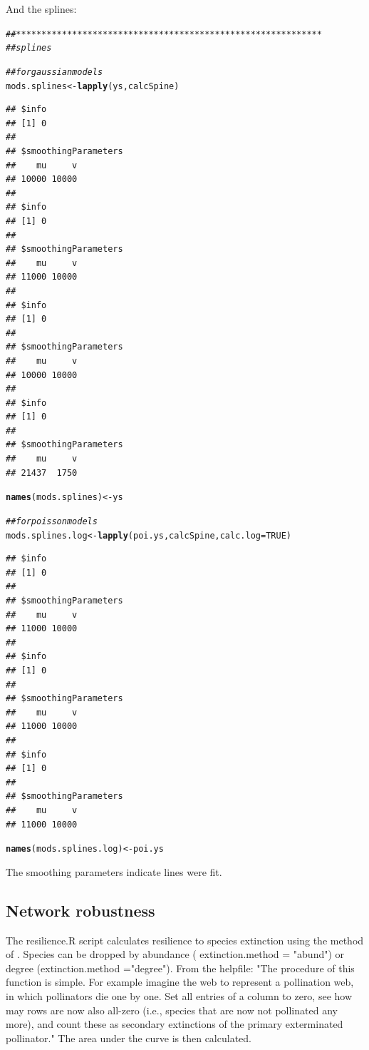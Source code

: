 \documentclass{article}\usepackage[]{graphicx}\usepackage[]{color}
\makeatletter
\newcommand{\hlnum}[1]{\textcolor[rgb]{0.686,0.059,0.569}{#1}}%
\newcommand{\hlcom}[1]{\textcolor[rgb]{0.678,0.584,0.686}{\textit{#1}}}%
\newcommand{\hlstd}[1]{\textcolor[rgb]{0.345,0.345,0.345}{#1}}%
\newcommand{\hlkwb}[1]{\textcolor[rgb]{0.69,0.353,0.396}{#1}}%
\newcommand{\hlkwc}[1]{\textcolor[rgb]{0.333,0.667,0.333}{#1}}%
\newcommand{\hlkwd}[1]{\textcolor[rgb]{0.737,0.353,0.396}{\textbf{#1}}}%
\newenvironment{kframe}{%
 \def\at@end@of@kframe{}%
 \ifinner\ifhmode%
  \def\at@end@of@kframe{\end{minipage}}%
  \begin{minipage}{\columnwidth}%
 \fi\fi%
 \def\FrameCommand##1{\hskip\@totalleftmargin \hskip-\fboxsep
 \colorbox{shadecolor}{##1}\hskip-\fboxsep
     \hskip-\linewidth \hskip-\@totalleftmargin \hskip\columnwidth}%
 \MakeFramed {\advance\hsize-\width
   \@totalleftmargin\z@ \linewidth\hsize
   \@setminipage}}%
 {\par\unskip\endMakeFramed%
 \at@end@of@kframe}
\newenvironment{knitrout}{}{} %
\makeatother
\begin{document}
And the splines:
\begin{knitrout}
\color{fgcolor}\begin{kframe}
\begin{alltt}
\hlcom{## ************************************************************}
\hlcom{## splines}

\hlcom{## for gaussian models}
\hlstd{mods.splines} \hlkwb{<-} \hlkwd{lapply}\hlstd{(ys, calcSpine)}
\end{alltt}
\begin{verbatim}
## $info
## [1] 0
## 
## $smoothingParameters
##    mu     v 
## 10000 10000 
## 
## $info
## [1] 0
## 
## $smoothingParameters
##    mu     v 
## 11000 10000 
## 
## $info
## [1] 0
## 
## $smoothingParameters
##    mu     v 
## 10000 10000 
## 
## $info
## [1] 0
## 
## $smoothingParameters
##    mu     v 
## 21437  1750
\end{verbatim}
\begin{alltt}
\hlkwd{names}\hlstd{(mods.splines)} \hlkwb{<-} \hlstd{ys}

\hlcom{## for poisson models}
\hlstd{mods.splines.log} \hlkwb{<-} \hlkwd{lapply}\hlstd{(poi.ys, calcSpine,} \hlkwc{calc.log}\hlstd{=}\hlnum{TRUE}\hlstd{)}
\end{alltt}
\begin{verbatim}
## $info
## [1] 0
## 
## $smoothingParameters
##    mu     v 
## 11000 10000 
## 
## $info
## [1] 0
## 
## $smoothingParameters
##    mu     v 
## 11000 10000 
## 
## $info
## [1] 0
## 
## $smoothingParameters
##    mu     v 
## 11000 10000
\end{verbatim}
\begin{alltt}
\hlkwd{names}\hlstd{(mods.splines.log)} \hlkwb{<-} \hlstd{poi.ys}
\end{alltt}
\end{kframe}
\end{knitrout}

The smoothing parameters indicate lines were fit.

\subsection{Network robustness}




The resilience.R script calculates resilience to species extinction
using the method of \citep{Memmott2004}. Species can be dropped by
abundance ( extinction.method = "abund") or degree (extinction.method
="degree"). From the helpfile: "The procedure of this function is
simple. For example imagine the web to represent a pollination web, in
which pollinators die one by one. Set all entries of a column to zero,
see how may rows are now also all-zero (i.e., species that are now not
pollinated any more), and count these as secondary extinctions of the
primary exterminated pollinator." The area under the curve is then
calculated.
\end{document}
